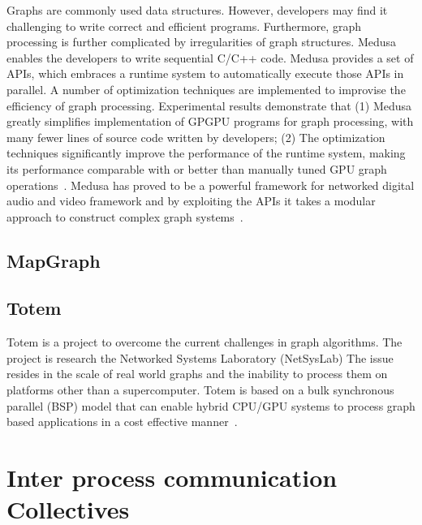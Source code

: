 Graphs are commonly used data structures. However, developers may find
it challenging to write correct and efficient programs. Furthermore,
graph processing is further complicated by irregularities of graph
structures. Medusa enables the developers to write sequential C/C++
code. Medusa provides a set of APIs, which embraces a runtime system
to automatically execute those APIs in parallel\cite{paper_medusa}.  A
number of optimization techniques are implemented to improvise the
efficiency of graph processing. Experimental results demonstrate that
(1) Medusa greatly simplifies implementation of GPGPU programs for
graph processing, with many fewer lines of source code written by
developers; (2) The optimization techniques significantly improve the
performance of the runtime system, making its performance comparable
with or better than manually tuned GPU graph
operations~\cite{paper_medusa}. Medusa has proved to be a powerful
framework for networked digital audio and video framework and by
exploiting the APIs it takes a modular approach to construct complex
graph systems~\cite{www-medusa}.

     \pv

\subsection{MapGraph}

\pv 

\subsection{Totem}

Totem is a project to overcome the current challenges in graph
algorithms.  The project is research the Networked Systems Laboratory
(NetSysLab) The issue resides in the scale of real world graphs and
the inability to process them on platforms other than a supercomputer.
Totem is based on a bulk synchronous parallel (BSP) model that can
enable hybrid CPU/GPU systems to process graph based applications in a
cost effective manner~\cite{www-netsyslab}.

     \pv


\section{Inter process communication Collectives}
\label{S:o-process-communication}


